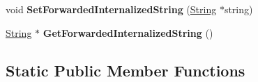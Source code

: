 \begin{DoxyCompactItemize}
\item 
void {\bfseries Set\+Forwarded\+Internalized\+String} (\hyperlink{classv8_1_1internal_1_1_string}{String} $\ast$string)\hypertarget{classv8_1_1internal_1_1_string_a3e2271a5799a0bcb1ae6291124118e1f}{}\label{classv8_1_1internal_1_1_string_a3e2271a5799a0bcb1ae6291124118e1f}

\item 
\hyperlink{classv8_1_1internal_1_1_string}{String} $\ast$ {\bfseries Get\+Forwarded\+Internalized\+String} ()\hypertarget{classv8_1_1internal_1_1_string_a6573d166e31907f596e44e25860bcb0a}{}\label{classv8_1_1internal_1_1_string_a6573d166e31907f596e44e25860bcb0a}

\end{DoxyCompactItemize}
\subsection*{Static Public Member Functions}
